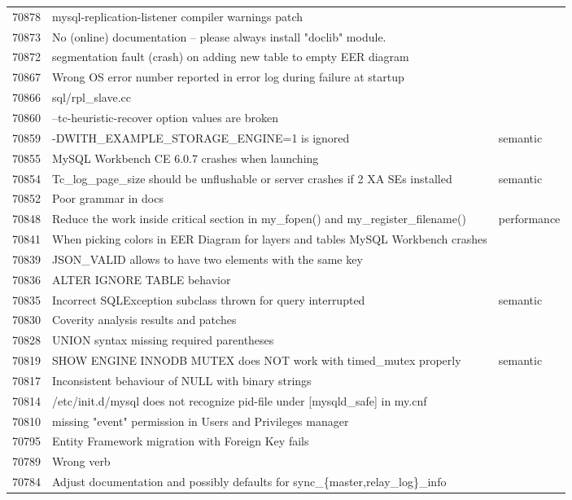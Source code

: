 \begin{longtable}[c]{p{1cm}p{10cm}p{1cm}}
70878 & mysql-replication-listener compiler warnings patch &  \\
70873 & No (online) documentation -- please always install "doclib" module. &  \\
70872 & segmentation fault (crash) on adding new table to empty EER diagram &  \\
70867 & Wrong OS error number reported in error log during failure at startup &  \\
70866 & sql/rpl\_slave.cc &  \\
70860 & --tc-heuristic-recover option values are broken &  \\
70859 & -DWITH\_EXAMPLE\_STORAGE\_ENGINE=1 is ignored & semantic \\
70855 & MySQL Workbench CE 6.0.7 crashes when launching &  \\
70854 & Tc\_log\_page\_size should be unflushable or server crashes if 2 XA SEs installed & semantic \\
70852 & Poor grammar in docs &  \\
70848 & Reduce the work inside critical section in my\_fopen() and my\_register\_filename() & performance \\
70841 & When picking colors in EER Diagram for layers and tables MySQL Workbench crashes &  \\
70839 & JSON\_VALID allows to have two elements with the same key &  \\
70836 & ALTER IGNORE TABLE behavior &  \\
70835 & Incorrect SQLException subclass thrown for query interrupted & semantic \\
70830 & Coverity analysis results and patches &  \\
70828 & UNION syntax missing required parentheses &  \\
70819 & SHOW ENGINE INNODB MUTEX does NOT work with timed\_mutex properly & semantic \\
70817 & Inconsistent behaviour of NULL with binary strings &  \\
70814 & /etc/init.d/mysql does not recognize pid-file under {[}mysqld\_safe{]} in my.cnf &  \\
70810 & missing "event" permission in Users and Privileges manager &  \\
70795 & Entity Framework migration with Foreign Key fails &  \\
70789 & Wrong verb &  \\
70784 & Adjust documentation and possibly defaults for sync\_\{master,relay\_log\}\_info &  \\

\end{longtable}
